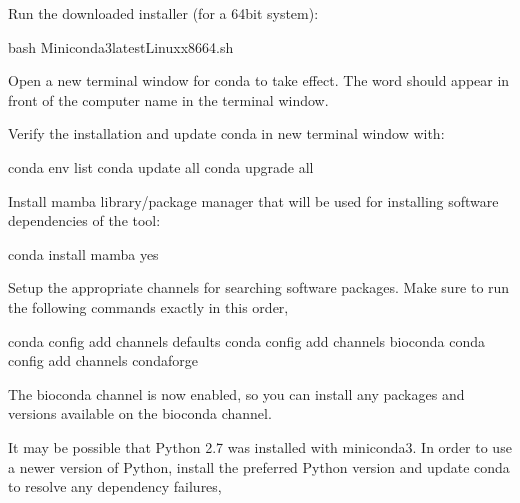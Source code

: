 \documentclass[letterpaper,10pt,english]{sphinxhowto}
\begin{document}
\sphinxAtStartPar
Run the downloaded installer (for a 64\sphinxhyphen{}bit system):

\begin{sphinxVerbatim}[commandchars=\\\{\}]
\PYGZdl{} bash Miniconda3\PYGZhy{}latest\PYGZhy{}Linux\PYGZhy{}x86\PYGZus{}64.sh
\end{sphinxVerbatim}

\sphinxAtStartPar
Open a new terminal window for conda to take effect. The word  should appear in front of the computer name in the terminal window.

\sphinxAtStartPar
Verify the installation and update conda in new terminal window with:

\begin{sphinxVerbatim}[commandchars=\\\{\}]
\PYGZdl{} conda env list
\PYGZdl{} conda update \PYGZhy{}\PYGZhy{}all
\PYGZdl{} conda upgrade \PYGZhy{}\PYGZhy{}all
\end{sphinxVerbatim}

\sphinxAtStartPar
Install mamba library/package manager that will be used for installing software dependencies of the tool:

\begin{sphinxVerbatim}[commandchars=\\\{\}]
\PYGZdl{} conda install mamba \PYGZhy{}\PYGZhy{}yes
\end{sphinxVerbatim}

\sphinxAtStartPar
Setup the appropriate channels for searching software packages. Make sure to run the following commands exactly in this order,

\begin{sphinxVerbatim}[commandchars=\\\{\}]
\PYGZdl{} conda config \PYGZhy{}\PYGZhy{}add channels defaults
\PYGZdl{} conda config \PYGZhy{}\PYGZhy{}add channels bioconda
\PYGZdl{} conda config \PYGZhy{}\PYGZhy{}add channels conda\PYGZhy{}forge
\end{sphinxVerbatim}

\sphinxAtStartPar
The bioconda channel is now enabled, so you can install any packages and versions available on the bioconda channel.

\sphinxAtStartPar
It may be possible that Python 2.7 was installed with miniconda3. In order to use a newer version of Python, install the preferred Python version and update conda to resolve any dependency failures,
\end{document}
